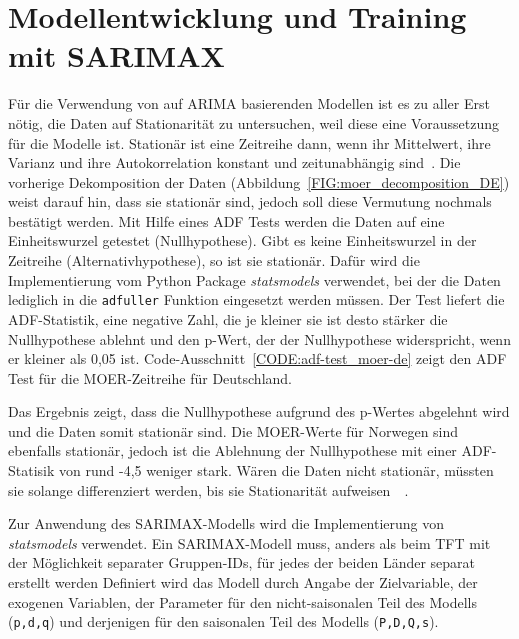 \section{Modellentwicklung und Training mit SARIMAX}\label{CAP:SARIMAX-training}
Für die Verwendung von auf \ac{ARIMA} basierenden Modellen ist es zu aller Erst nötig, die Daten auf Stationarität zu untersuchen, weil diese eine Voraussetzung für die Modelle ist.
Stationär ist eine Zeitreihe dann, wenn ihr Mittelwert, ihre Varianz und ihre Autokorrelation konstant und zeitunabhängig sind~\cite{Peixeiro.2022}.
Die vorherige Dekomposition der Daten (Abbildung~\ref{FIG:moer_decomposition_DE}) weist darauf hin, dass sie stationär sind, jedoch soll diese Vermutung nochmals bestätigt werden.
Mit Hilfe eines \ac{ADF} Tests werden die Daten auf eine Einheitswurzel getestet (Nullhypothese).
Gibt es keine Einheitswurzel in der Zeitreihe (Alternativhypothese), so ist sie stationär.
Dafür wird die Implementierung vom Python Package \textit{statsmodels} verwendet, bei der die Daten lediglich in die \lstinline[columns=fixed]{adfuller} Funktion eingesetzt werden müssen.
Der Test liefert die ADF-Statistik, eine negative Zahl, die je kleiner sie ist desto stärker die Nullhypothese ablehnt und den p-Wert, der der Nullhypothese widerspricht, wenn er kleiner als 0,05 ist.
Code-Ausschnitt~\ref{CODE:adf-test_moer-de} zeigt den \ac{ADF} Test für die \ac{MOER}-Zeitreihe für Deutschland.

Das Ergebnis zeigt, dass die Nullhypothese aufgrund des p-Wertes abgelehnt wird und die Daten somit stationär sind.
Die \ac{MOER}-Werte für Norwegen sind ebenfalls stationär, jedoch ist die Ablehnung der Nullhypothese mit einer ADF-Statisik von rund -4,5 weniger stark.
Wären die Daten nicht stationär, müssten sie solange differenziert werden, bis sie Stationarität aufweisen~\cite{Peixeiro.2022}~\cite{Rahmadhan.8.5.2023}.

Zur Anwendung des SARIMAX-Modells wird die Implementierung von \textit{statsmodels} verwendet.
Ein SARIMAX-Modell muss, anders als beim \ac{TFT} mit der Möglichkeit separater Gruppen-IDs, für jedes der beiden Länder separat erstellt werden
Definiert wird das Modell durch Angabe der Zielvariable, der exogenen Variablen, der Parameter für den nicht-saisonalen Teil des Modells (\lstinline[columns=fixed]{p,d,q}) und derjenigen für den saisonalen Teil des Modells (\lstinline[columns=fixed]{P,D,Q,s}).

